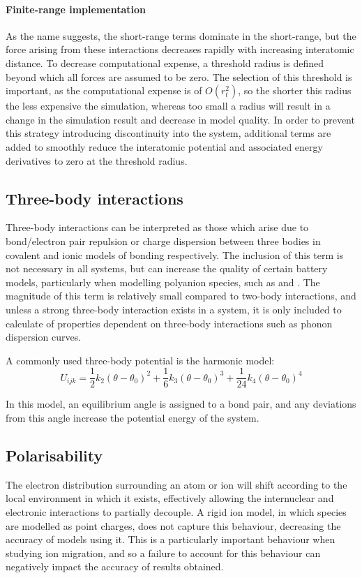 \paragraph{Finite-range implementation}
As the name suggests, the short-range terms dominate in the short-range, but the force arising from these interactions decreases rapidly with increasing interatomic distance.
To decrease computational expense, a threshold radius is defined beyond which all forces are assumed to be zero.
The selection of this threshold is important, as the computational expense is of $O(r_t^2)$, so the shorter this radius the less expensive the simulation, whereas too small a radius will result in a change in the simulation result and decrease in model quality.
In order to prevent this strategy introducing discontinuity into the system, additional terms are added to smoothly reduce the interatomic potential and associated energy derivatives to zero at the threshold radius. 


\subsection{Three-body interactions}
Three-body interactions can be interpreted as those which arise due to bond/electron pair repulsion or charge dispersion between three bodies in covalent and ionic models of bonding respectively.
The inclusion of this term is not necessary in all systems, but can increase the quality of certain battery models, particularly when modelling polyanion species, such as  and .
The magnitude of this term is relatively small compared to two-body interactions, and unless a strong three-body interaction exists in a system, it is only included to calculate of properties dependent on three-body interactions such as phonon dispersion curves.

A commonly used three-body potential is the harmonic model:
\begin{equation}
  U_{ijk} = \frac{1}{2}k_2(\theta-\theta_0)^2   + \frac{1}{6}k_3(\theta-\theta_0)^3    + \frac{1}{24}k_4(\theta-\theta_0)^4
  \label{eq:threebody}
\end{equation}

In this model, an equilibrium angle is assigned to a bond pair, and any deviations from this angle increase the potential energy of the system.

\subsection{Polarisability}
The electron distribution surrounding an atom or ion will shift according to the local environment in which it exists, effectively allowing the internuclear and electronic interactions to partially decouple.
A rigid ion model, in which species are modelled as point charges, does not capture this behaviour, decreasing the accuracy of models using it.
This is a particularly important behaviour when studying ion migration, and so a failure to account for this behaviour can negatively impact the accuracy of results obtained.

